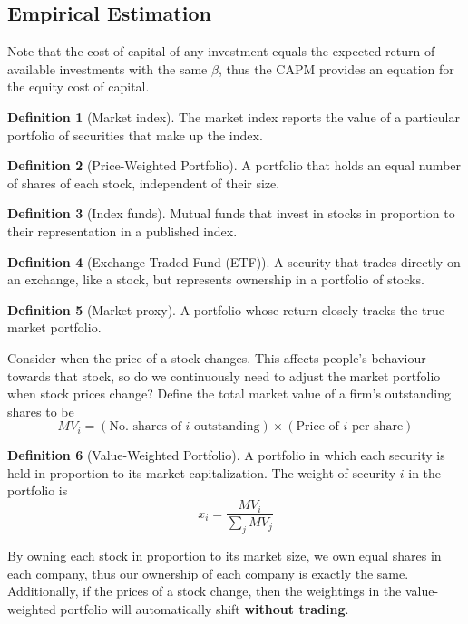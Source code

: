 \documentclass[11pt]{article}
\theoremstyle{definition}
\newtheorem*{definition}{Definition}
\begin{document}
\subsection{Empirical Estimation}
Note that the cost of capital of any investment equals the expected return of available investments with the same $\beta$, thus the CAPM provides an equation for the equity cost of capital.
\begin{definition}[Market index]
The market index reports the value of a particular portfolio of securities that make up the index.
\end{definition}
\begin{definition}[Price-Weighted Portfolio]
    A portfolio that holds an equal number of shares of each stock, independent of their size.
\end{definition}
\begin{definition}[Index funds]
    Mutual funds that invest in stocks in proportion to their representation in a published index.
\end{definition}
\begin{definition}[Exchange Traded Fund (ETF)]
    A security that trades directly on an exchange, like a stock, but represents ownership in a portfolio of stocks.
\end{definition}
\begin{definition}[Market proxy]
    A portfolio whose return closely tracks the true market portfolio.
\end{definition}
Consider when the price of a stock changes. This affects people's behaviour towards that stock, so do we continuously need to adjust the market portfolio when stock prices change? Define the total market value of a firm's outstanding shares to be 
\begin{equation*}
    MV_i = (\text{No. shares of $i$ outstanding}) \times (\text{Price of $i$ per share})
\end{equation*}
\begin{definition}[Value-Weighted Portfolio]
    A portfolio in which each security is held in proportion to its market capitalization. The weight of security $i$ in the portfolio is
    \begin{equation*}
        x_i = \frac{MV_i}{\sum_j MV_j}
    \end{equation*}
\end{definition}
By owning each stock in proportion to its market size, we own equal shares in each company, thus our ownership of each company is exactly the same. Additionally, if the prices of a stock change, then the weightings in the value-weighted portfolio will automatically shift \textbf{without trading}.
\end{document}
